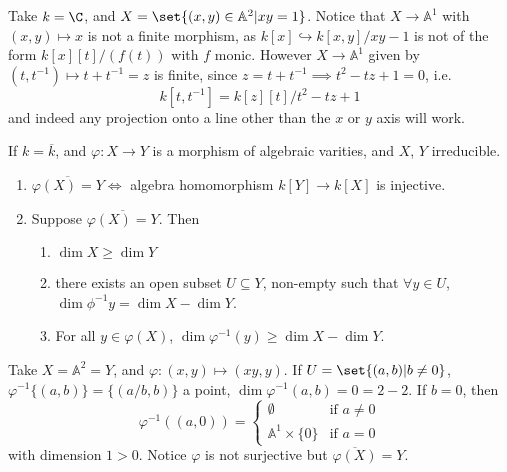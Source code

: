 \documentclass{article}
\newcommand{\A}{\mathbb{A}}
\begin{document}
\begin{eg}
    Take $k = \C$, and $X = \set{(x, y) \in \A^2 | x y = 1}$. Notice that $X \to \A^1$ with $(x, y) \mapsto x$ is not a finite morphism, as $k[x] \hookrightarrow k[x, y] /xy-1$ is not of the form $k[x][t]/(f(t))$ with $f$ monic.
    However $X \to \A^1$ given by $(t, t^{-1}) \mapsto t + t^{-1} = z$ is finite, since $z = t+t^{-1} \implies t^2 - tz + 1 = 0$, i.e.\
    \begin{equation}
        k[t, t^{-1}] = k[z][t]/t^2-tz+1
    \end{equation}
    and indeed any projection onto a line other than the $x$ or $y$ axis will work.
\end{eg}
\begin{thm}
    If $k = \overline{k}$, and $\varphi: X \to Y$ is a morphism of algebraic varities, and $X$, $Y$ irreducible.
    \begin{enumerate}[label=(\alph*)]
        \item $\overline{\varphi(X) = Y} \iff$ algebra homomorphism $k[Y] \to k[X]$ is injective.
        \item Suppose $\overline{\varphi(X) = Y}$. Then
            \begin{enumerate}[label=(\roman*)]
                \item $\dim X \geq \dim Y$
                \item there exists an open subset $U \subseteq Y$, non-empty such that $\forall y \in U$, $\dim \phi^{-1} y = \dim X - \dim Y$.
                \item For all $y \in \varphi(X)$, $\dim \varphi^{-1}(y) \geq \dim X - \dim Y$.
            \end{enumerate}
    \end{enumerate}
\end{thm}
\begin{eg}
    Take $X = \A^2 = Y$, and $\varphi: (x, y) \mapsto (xy, y)$.
    If $U = \set{(a, b) | b \neq 0}$, $\varphi^{-1}\{(a, b)\} = \{(a/b, b)\}$ a point, $\dim \varphi^{-1}(a, b) = 0 = 2- 2$.
    If $b = 0$, then
    \begin{equation}
        \varphi^{-1}((a, 0)) =
        \begin{cases}
            \emptyset & \text{if } a \neq 0 \\
            \A^1 \times \{0\} & \text{if } a = 0
        \end{cases}
    \end{equation}
    with dimension $1 > 0$. Notice $\varphi$ is not surjective but $\overline{\varphi(X)} = Y$.
\end{eg}
\end{document}
